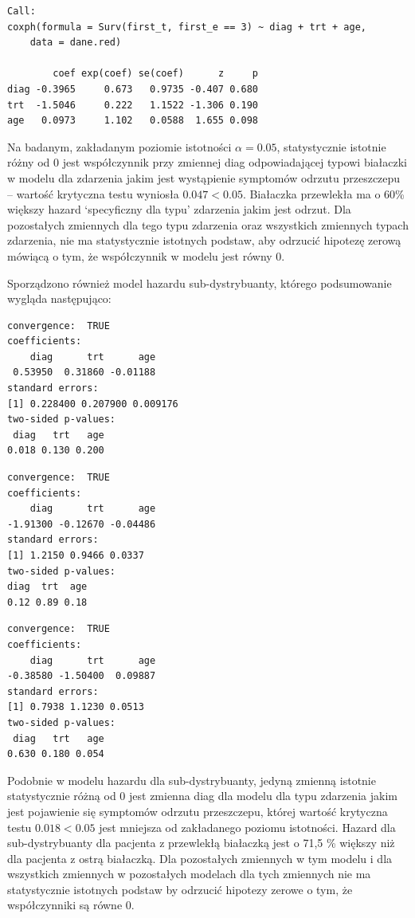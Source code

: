 \documentclass[]{article}
\begin{document}
\begin{verbatim}
Call:
coxph(formula = Surv(first_t, first_e == 3) ~ diag + trt + age, 
    data = dane.red)

        coef exp(coef) se(coef)      z     p
diag -0.3965     0.673   0.9735 -0.407 0.680
trt  -1.5046     0.222   1.1522 -1.306 0.190
age   0.0973     1.102   0.0588  1.655 0.098
\end{verbatim}

Na badanym, zakładanym poziomie istotności \(\alpha=0.05\),
statystycznie istotnie różny od 0 jest współczynnik przy zmiennej
\textsf{diag} odpowiadającej typowi białaczki w modelu dla zdarzenia
jakim jest wystąpienie symptomów odrzutu przeszczepu -- wartość
krytyczna testu wyniosła \(0.047<0.05\). Białaczka przewlekła ma o 60\%
większy hazard `specyficzny dla typu' zdarzenia jakim jest odrzut. Dla
pozostałych zmiennych dla tego typu zdarzenia oraz wszystkich zmiennych
 typach zdarzenia, nie ma statystycznie istotnych
podstaw, aby odrzucić hipotezę zerową mówiącą o tym, że współczynnik w
modelu jest równy 0.

Sporządzono również model hazardu sub-dystrybuanty, którego podsumowanie
wygląda następująco:

\begin{verbatim}
convergence:  TRUE 
coefficients:
    diag      trt      age 
 0.53950  0.31860 -0.01188 
standard errors:
[1] 0.228400 0.207900 0.009176
two-sided p-values:
 diag   trt   age 
0.018 0.130 0.200 
\end{verbatim}

\begin{verbatim}
convergence:  TRUE 
coefficients:
    diag      trt      age 
-1.91300 -0.12670 -0.04486 
standard errors:
[1] 1.2150 0.9466 0.0337
two-sided p-values:
diag  trt  age 
0.12 0.89 0.18 
\end{verbatim}

\begin{verbatim}
convergence:  TRUE 
coefficients:
    diag      trt      age 
-0.38580 -1.50400  0.09887 
standard errors:
[1] 0.7938 1.1230 0.0513
two-sided p-values:
 diag   trt   age 
0.630 0.180 0.054 
\end{verbatim}

Podobnie w modelu hazardu dla sub-dystrybuanty, jedyną zmienną istotnie
statystycznie różną od 0 jest zmienna \textsf{diag} dla modelu dla typu
zdarzenia jakim jest pojawienie się symptomów odrzutu przeszczepu,
której wartość krytyczna testu \(0.018<0.05\) jest mniejsza od
zakładanego poziomu istotności. Hazard dla sub-dystrybuanty dla pacjenta
z przewlekłą białaczką jest o 71,5 \% większy niż dla pacjenta z ostrą
białaczką. Dla pozostałych zmiennych w tym modelu i dla wszystkich
zmiennych w pozostałych modelach dla tych zmiennych nie ma statystycznie
istotnych podstaw by odrzucić hipotezy zerowe o tym, że współczynniki są
równe 0.
\end{document}
